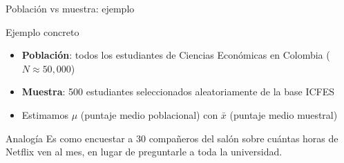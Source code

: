 \documentclass[aspectratio=169, 11pt]{beamer}
\begin{document}
\begin{frame}{Poblaci\'on vs muestra: ejemplo}
\begin{exampleblock}{Ejemplo concreto}
\begin{itemize}
\item \textbf{Poblaci\'on}: todos los estudiantes de Ciencias Econ\'omicas en Colombia ($N \approx 50{,}000$)
\item \textbf{Muestra}: 500 estudiantes seleccionados aleatoriamente de la base ICFES
\item Estimamos $\mu$ (puntaje medio poblacional) con $\bar{x}$ (puntaje medio muestral)
\end{itemize}
\end{exampleblock}

\begin{alertblock}{Analog\'ia}
{\small Es como encuestar a 30 compa\~neros del sal\'on sobre cu\'antas horas de Netflix ven al mes, en lugar de preguntarle a toda la universidad.}
\end{alertblock}

\begin{center}
\end{center}
\end{frame}
\end{document}
